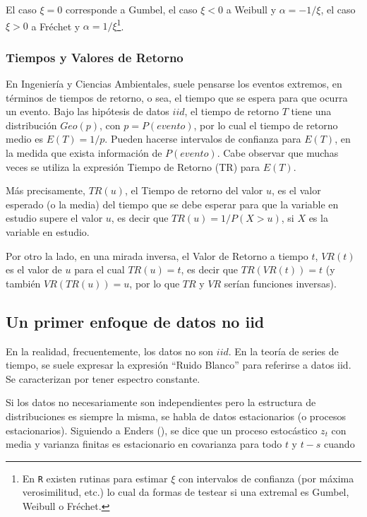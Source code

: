 \documentclass[
  12pt]{article}
\begin{document}
El caso \(\xi=0\) corresponde a Gumbel, el caso \(\xi<0\) a Weibull y
\(\alpha=-1/ \xi\), el caso \(\xi>0\) a Fréchet y
\(\alpha=1/ \xi\)\footnote{En \texttt{R} existen rutinas para estimar $\xi$ con intervalos de confianza (por máxima verosimilitud, etc.) lo cual da formas de testear si una extremal es Gumbel, Weibull o Fréchet.}.

\subsubsection*{Tiempos y Valores de Retorno}

En Ingeniería y Ciencias Ambientales, suele pensarse los eventos
extremos, en términos de tiempos de retorno, o sea, el tiempo que se
espera para que ocurra un evento. Bajo las hipótesis de datos \(iid\),
el tiempo de retorno \(T\) tiene una distribución \(Geo(p)\), con
\(p = P(evento)\), por lo cual el tiempo de retorno medio es
\(E(T)=1/p\). Pueden hacerse intervalos de confianza para \(E(T)\), en
la medida que exista información de \(P(evento)\). Cabe observar que
muchas veces se utiliza la expresión Tiempo de Retorno (TR) para
\(E(T)\).

Más precisamente, \(TR(u)\), el Tiempo de retorno del valor \(u\), es el
valor esperado (o la media) del tiempo que se debe esperar para que la
variable en estudio supere el valor \(u\), es decir que
\(TR(u) = 1/P(X>u)\), si \(X\) es la variable en estudio.

Por otro la lado, en una mirada inversa, el Valor de Retorno a tiempo
\(t\), \(VR(t)\) es el valor de \(u\) para el cual \(TR(u)=t\), es decir
que \(TR(VR(t))=t\) (y también \(VR(TR(u))=u\), por lo que \(TR\) y
\(VR\) serían funciones inversas).

\subsection{Un primer enfoque de datos no
iid}\label{un-primer-enfoque-de-datos-no-iid}

En la realidad, frecuentemente, los datos no son \(iid\). En la teoría
de series de tiempo, se suele expresar la expresión ``Ruido Blanco''
para referirse a datos iid. Se caracterizan por tener espectro
constante.

Si los datos no necesariamente son independientes pero la estructura de
distribuciones es siempre la misma, se habla de datos estacionarios (o
procesos estacionarios). Siguiendo a Enders
(), se dice que un proceso estocástico
\(z_{t}\) con media y varianza finitas es estacionario en covarianza
para todo \(t\) y \(t-s\) cuando
\end{document}
